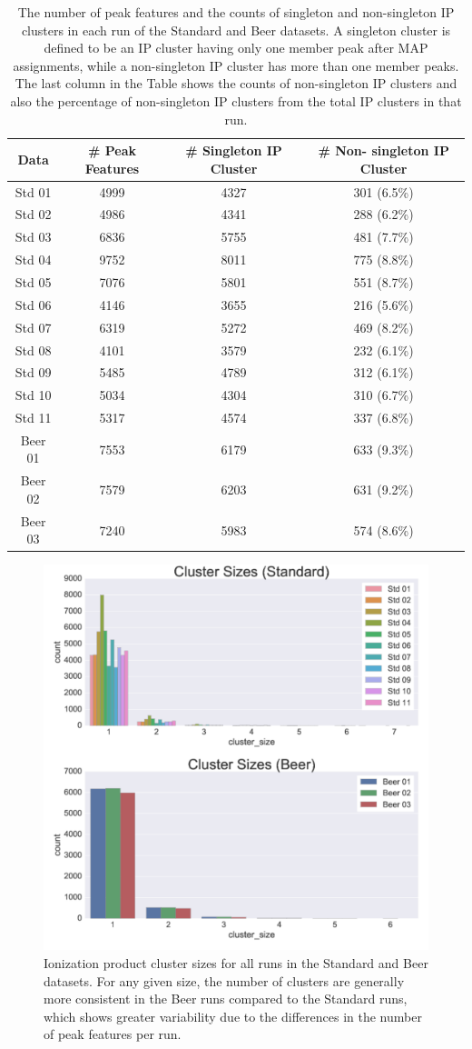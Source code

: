 \begin{table}[!htbp]
\centering
\caption{The number of peak features and the counts of singleton and non-singleton IP clusters in each run of the Standard and Beer datasets. A singleton cluster is defined to be an IP cluster having only one member peak after MAP assignments, while a non-singleton IP cluster has more than one member peaks. The last column in the Table shows the counts of non-singleton IP clusters and also the percentage of non-singleton IP clusters from the total IP clusters in that run. \label{Tab:cluster-counts}}
\begin{tabular}{|c|c|c|c|} 
\hline 
Data & \# Peak Features & \# Singleton IP Cluster & \# Non- singleton IP Cluster\tabularnewline
\hline 
\hline 
Std 01 & 4999 & 4327 & 301 (6.5\%)\tabularnewline
\hline 
Std 02 & 4986 & 4341 & 288 (6.2\%)\tabularnewline
\hline 
Std 03 & 6836 & 5755 & 481 (7.7\%)\tabularnewline
\hline 
Std 04 & 9752 & 8011 & 775 (8.8\%)\tabularnewline
\hline 
Std 05 & 7076 & 5801 & 551 (8.7\%)\tabularnewline
\hline 
Std 06 & 4146 & 3655 & 216 (5.6\%)\tabularnewline
\hline 
Std 07 & 6319 & 5272 & 469 (8.2\%)\tabularnewline
\hline 
Std 08 & 4101 & 3579 & 232 (6.1\%)\tabularnewline
\hline 
Std 09 & 5485 & 4789 & 312 (6.1\%)\tabularnewline
\hline 
Std 10 & 5034 & 4304 & 310 (6.7\%)\tabularnewline
\hline 
Std 11 & 5317 & 4574 & 337 (6.8\%)\tabularnewline
\hline 
Beer 01  & 7553 & 6179 & 633 (9.3\%)\tabularnewline
\hline 
Beer 02 & 7579 & 6203 & 631 (9.2\%)\tabularnewline
\hline 
Beer 03 & 7240 & 5983 & 574 (8.6\%)\tabularnewline
\hline 
\end{tabular}
\end{table}

\begin{figure}[!htbp]
\centering
\includegraphics[width=0.5\linewidth]{05-precursor-cluster/figures/counts_cluster.pdf}
\caption{\label{fig:cluster-counts} Ionization product cluster sizes for all runs in the Standard and Beer datasets. For any given size, the number of clusters are generally more consistent in the Beer runs compared to the Standard runs, which shows greater variability due to the differences in the number of peak features per run.}
\end{figure}

